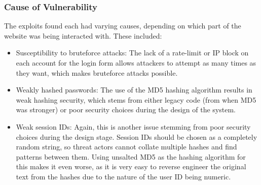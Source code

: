 \documentclass{report}
\begin{document}
\subsubsection{Cause of Vulnerability}
The exploits found each had varying causes, depending on which part of the website was being interacted with. These included:
\begin{itemize}
	\item Susceptibility to bruteforce attacks: The lack of a rate-limit or IP block on each account for the login form allows attackers to attempt as many times as they want, which makes bruteforce attacks possible. 
	\item Weakly hashed passwords: The use of the MD5 hashing algorithm results in weak hashing security, which stems from either legacy code (from when MD5 was stronger) or poor security choices during the design of the system.
	\item Weak session IDs: Again, this is another issue stemming from poor security choices during the design stage. Session IDs should be chosen as a completely random string, so threat actors cannot collate multiple hashes and find patterns between them. Using unsalted MD5 as the hashing algorithm for this makes it even worse, as it is very easy to reverse engineer the original text from the hashes due to the nature of the user ID being numeric.
\end{itemize}
\end{document}
